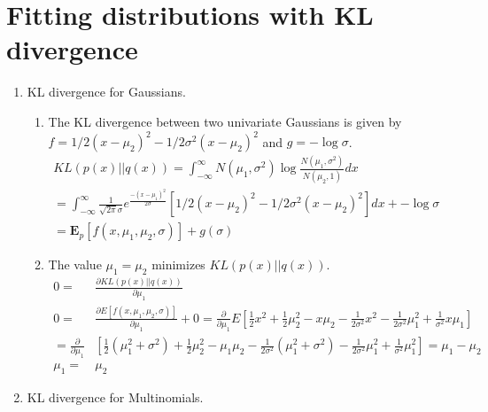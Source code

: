 \section{Fitting distributions with KL divergence}
\begin{enumerate}
\item KL divergence for Gaussians. 

\begin{enumerate}
\item The KL divergence between two univariate Gaussians is given by $f=1/2(x-\mu_{2})^{2}-1/2\sigma^{2}(x-\mu_{2})^{2}$
and $g=-\log\sigma$. \begin{align*}
KL(p(x)||q(x))=\int_{-\infty}^{\infty}N(\mu_{1},\sigma^{2})\log\frac{N(\mu_{1},\sigma^{2})}{N(\mu_{2},1)}dx & \;\\
=\int_{-\infty}^{\infty}\frac{1}{\sqrt{2\pi}\sigma}e^{\frac{-(x-\mu_{1})^{2}}{2\sigma}}[1/2(x-\mu_{2})^{2}-1/2\sigma^{2}(x-\mu_{2})^{2}]dx+-\log\sigma & \;\\
=\mathbf{E}_{p}[f(x,\mu_{1},\mu_{2},\sigma)]+g(\sigma) & \;\end{align*}
 
\item The value $\mu_{1}=\mu_{2}$ minimizes $KL(p(x)||q(x))$. \begin{align*}
0= & \frac{\partial KL(p(x)||q(x))}{\partial\mu_{1}}\;\\
0= & \frac{\partial E[f(x,\mu_{1},\mu_{2},\sigma)]}{\partial\mu_{1}}+0=\frac{\partial}{\partial\mu_{1}}E[\frac{1}{2}x^{2}+\frac{1}{2}\mu_{2}^{2}-x\mu_{2}-\frac{1}{2\sigma^{2}}x^{2}-\frac{1}{2\sigma^{2}}\mu_{1}^{2}+\frac{1}{\sigma^{2}}x\mu_{1}]\:\\
=\frac{\partial}{\partial\mu_{1}} & [\frac{1}{2}(\mu_{1}^{2}+\sigma^{2})+\frac{1}{2}\mu_{2}^{2}-\mu_{1}\mu_{2}-\frac{1}{2\sigma^{2}}(\mu_{1}^{2}+\sigma^{2})-\frac{1}{2\sigma^{2}}\mu_{1}^{2}+\frac{1}{\sigma^{2}}\mu_{1}^{2}]=\mu_{1}-\mu_{2}\;\\
\mu_{1}= & \mu_{2}\end{align*}
 
\end{enumerate}
\item KL divergence for Multinomials. 


\end{enumerate}
